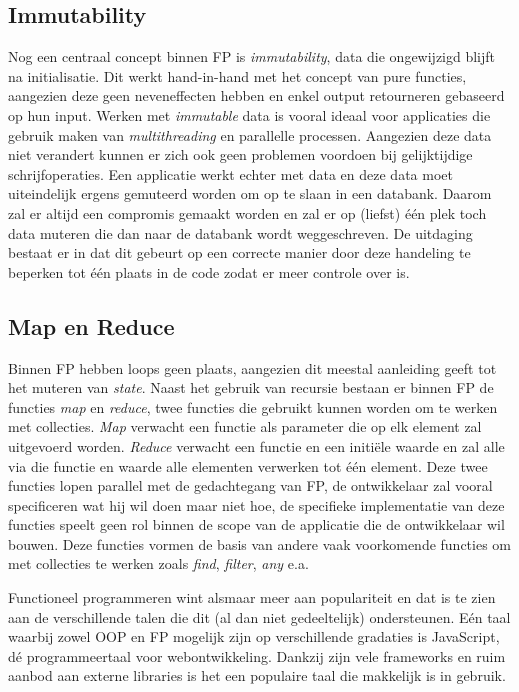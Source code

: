 \subsection{Immutability}
Nog een centraal concept binnen FP is \textit{immutability}, data die ongewijzigd blijft na initialisatie. Dit werkt hand-in-hand met het concept van pure functies, aangezien deze geen neveneffecten hebben en enkel output retourneren gebaseerd op hun input. Werken met \textit{immutable} data is vooral ideaal voor applicaties die gebruik maken van \textit{multithreading} en parallelle processen. Aangezien deze data niet verandert kunnen er zich ook geen problemen voordoen bij gelijktijdige schrijfoperaties. Een applicatie werkt echter met data en deze data moet uiteindelijk ergens gemuteerd worden om op te slaan in een databank. Daarom zal er altijd een compromis gemaakt worden en zal er op (liefst) één plek toch data muteren die dan naar de databank wordt weggeschreven. De uitdaging bestaat er in dat dit gebeurt op een correcte manier door deze handeling te beperken tot één plaats in de code zodat er meer controle over is.

\subsection{Map en Reduce}
Binnen FP hebben loops geen plaats, aangezien dit meestal aanleiding geeft tot het muteren van \textit{state}. Naast het gebruik van recursie bestaan er binnen FP de functies \textit{map} en \textit{reduce}, twee functies die gebruikt kunnen worden om te werken met collecties. \textit{Map} verwacht een functie als parameter die op elk element zal uitgevoerd worden. \textit{Reduce} verwacht een functie en een initiële waarde en zal alle via die functie en waarde alle elementen verwerken tot één element. Deze twee functies lopen parallel met de gedachtegang van FP, de ontwikkelaar zal vooral specificeren wat hij wil doen maar niet hoe, de specifieke implementatie van deze functies speelt geen rol binnen de scope van de applicatie die de ontwikkelaar wil bouwen. Deze functies vormen de basis van andere vaak voorkomende functies om met collecties te werken zoals \textit{find}, \textit{filter}, \textit{any} e.a.

Functioneel programmeren wint alsmaar meer aan populariteit en dat is te zien aan de verschillende talen die dit (al dan niet gedeeltelijk) ondersteunen. Eén taal waarbij zowel OOP en FP mogelijk zijn op verschillende gradaties is JavaScript, dé programmeertaal voor webontwikkeling. Dankzij zijn vele frameworks en ruim aanbod aan externe libraries is het een populaire taal die makkelijk is in gebruik.

